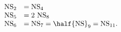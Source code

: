 \begin{equation}
  \begin{array}{rl}
  {\rm NS}_2 &= {\rm NS}_4 \\ 
  {\rm NS}_5 &= 2~{\rm NS}_8 \\ 
  {\rm NS}_6 &=  {\rm NS}_7 = \half {\rm NS}_9 = {\rm NS}_{11}.
  \end{array}
\end{equation}

